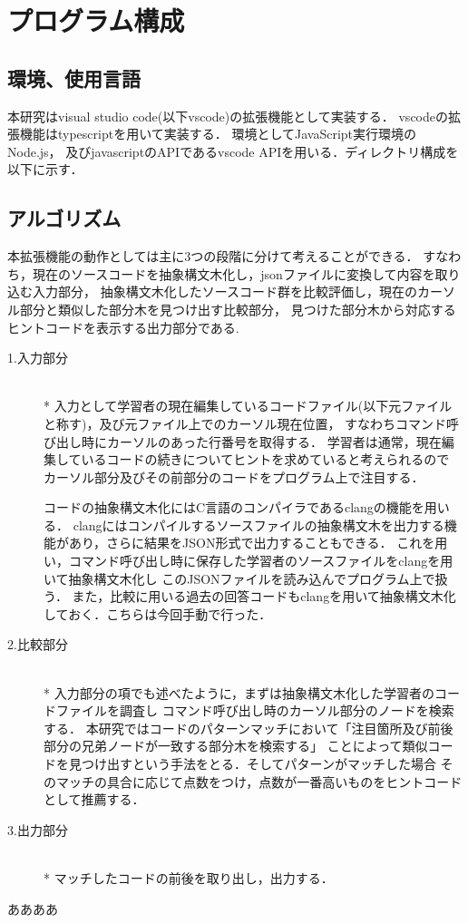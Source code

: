 \documentclass[main]{subfiles}
\begin{document}
\chapter{プログラム構成}

\section{環境、使用言語}
本研究はvisual studio code(以下vscode)の拡張機能として実装する．
vscodeの拡張機能はtypescriptを用いて実装する．
環境としてJavaScript実行環境のNode.js，
及びjavascriptのAPIであるvscode APIを用いる．ディレクトリ構成を以下に示す．

\section{アルゴリズム}
本拡張機能の動作としては主に3つの段階に分けて考えることができる．
すなわち，現在のソースコードを抽象構文木化し，jsonファイルに変換して内容を取り込む入力部分，
抽象構文木化したソースコード群を比較評価し，現在のカーソル部分と類似した部分木を見つけ出す比較部分，
見つけた部分木から対応するヒントコードを表示する出力部分である.

\begin{description}
\item[1.入力部分 ] 　\\*
入力として学習者の現在編集しているコードファイル(以下元ファイルと称す)，及び元ファイル上でのカーソル現在位置，
すなわちコマンド呼び出し時にカーソルのあった行番号を取得する．
学習者は通常，現在編集しているコードの続きについてヒントを求めていると考えられるので
カーソル部分及びその前部分のコードをプログラム上で注目する．

コードの抽象構文木化にはC言語のコンパイラであるclangの機能を用いる．
clangにはコンパイルするソースファイルの抽象構文木を出力する機能があり，さらに結果をJSON形式で出力することもできる．
これを用い，コマンド呼び出し時に保存した学習者のソースファイルをclangを用いて抽象構文木化し
このJSONファイルを読み込んでプログラム上で扱う．
また，比較に用いる過去の回答コードもclangを用いて抽象構文木化しておく．こちらは今回手動で行った．
\item[2.比較部分 ] 　\\*
入力部分の項でも述べたように，まずは抽象構文木化した学習者のコードファイルを調査し
コマンド呼び出し時のカーソル部分のノードを検索する．
本研究ではコードのパターンマッチにおいて「注目箇所及び前後部分の兄弟ノードが一致する部分木を検索する」
ことによって類似コードを見つけ出すという手法をとる．そしてパターンがマッチした場合
そのマッチの具合に応じて点数をつけ，点数が一番高いものをヒントコードとして推薦する．
\item[3.出力部分 ] 　\\*
マッチしたコードの前後を取り出し，出力する．
\end{description}

ああああ
\end{document}
